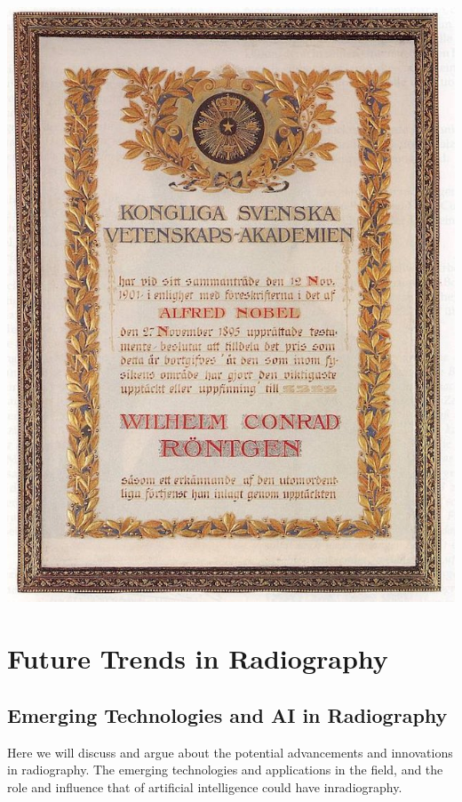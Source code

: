 \documentclass[a4paper,12pt]{report}
\begin{document}
\begin{center}
  \includegraphics[scale = 0.25]{nobelpreis.jpg}
\end{center}

\chapter{Future Trends in Radiography}
\section{Emerging Technologies and AI in Radiography}

Here we will discuss and argue about the potential advancements and innovations in radiography. The emerging technologies and applications in the field, and the role and influence that of artificial intelligence could have inradiography.
\end{document}
